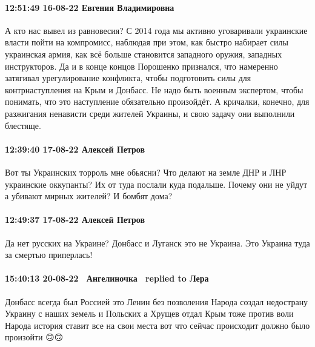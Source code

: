  
 
 
 
 

\paragraph{12:51:49 16-08-22 Евгения Владимировна}

А кто нас вывел из равновесия? С 2014 года мы активно уговаривали украинские
власти пойти на компромисс, наблюдая при этом, как быстро набирает силы
украинская армия, как всё больше становится западного оружия, западных
инструкторов. Да и в конце концов Порошенко признался, что намеренно затягивал
урегулирование конфликта, чтобы подготовить силы для контрнаступления на Крым и
Донбасс. Не надо быть военным экспертом, чтобы понимать, что это наступление
обязательно произойдёт. А кричалки, конечно, для разжигания ненависти среди
жителей Украины, и свою задачу они выполнили блестяще.

\paragraph{12:39:40 17-08-22 Алексей Петров}

Вот ты Украинских торроль мне обьясни? Что делают на земле ДНР и ЛНР украинские
оккупанты? Их от туда послали куда подальше. Почему они не уйдут а убивают
мирных жителей? И бомбят дома?

\paragraph{12:49:37 17-08-22 Алексей Петров}

Да нет русских на Украине? Донбасс и Луганск это не Украина. Это Украина туда
за смертью приперлась!

\paragraph{15:40:13 20-08-22 🧚‍♀️Ангелиночка 🧚‍♀️replied to Лера}

Донбасс всегда был Россией это Ленин без позволения Народа создал недострану
Украину с наших земель и Польских а Хрущев отдал Крым тоже против воли Народа
история ставит все на свои места вот что сейчас происходит должно было
произойти 🙃🙃

